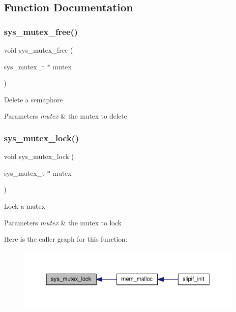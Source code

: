 \subsection{Function Documentation}
\mbox{\label{group__sys__mutex_ga16336ce68b741e98204102ca4bc84dd9}} 
\subsubsection{\texorpdfstring{sys\+\_\+mutex\+\_\+free()}{sys\_mutex\_free()}}
{\footnotesize\ttfamily void sys\+\_\+mutex\+\_\+free (\begin{DoxyParamCaption}\item[{sys\+\_\+mutex\+\_\+t $\ast$}]{mutex }\end{DoxyParamCaption})}

Delete a semaphore 
\begin{DoxyParams}{Parameters}
{\em mutex} & the mutex to delete \\
\hline
\end{DoxyParams}
\mbox{\label{group__sys__mutex_ga4d4eb9afe5965fa2661dd54ff55d616a}} 
\subsubsection{\texorpdfstring{sys\+\_\+mutex\+\_\+lock()}{sys\_mutex\_lock()}}
{\footnotesize\ttfamily void sys\+\_\+mutex\+\_\+lock (\begin{DoxyParamCaption}\item[{sys\+\_\+mutex\+\_\+t $\ast$}]{mutex }\end{DoxyParamCaption})}

Lock a mutex 
\begin{DoxyParams}{Parameters}
{\em mutex} & the mutex to lock \\
\hline
\end{DoxyParams}
Here is the caller graph for this function\+:
\nopagebreak
\begin{figure}[H]
\begin{center}
\leavevmode
\includegraphics[width=350pt]{group__sys__mutex_ga4d4eb9afe5965fa2661dd54ff55d616a_icgraph}
\end{center}
\end{figure}
\mbox{\label{group__sys__mutex_ga38e7dae1fd88b338eb1cd97f110f3897}} 
